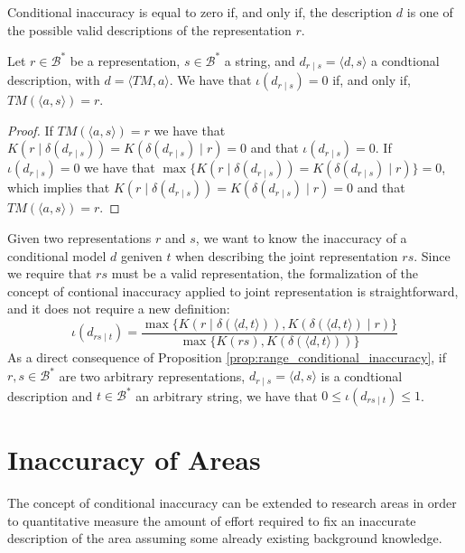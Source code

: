 Conditional inaccuracy is equal to zero if, and only if, the description $d$ is one of the possible valid descriptions of the representation $r$.

\begin{proposition}\label{prop:perfect_description}
Let $r \in \mathcal{B}^\ast$ be a representation, $s \in \mathcal{B}^\ast$ a string, and $d_{r \mid s} = \langle d, s \rangle$ a condtional description, with $ d = \langle TM, a \rangle$. We have that $\iota(d_{r \mid s}) = 0$ if, and only if, $TM \left(\langle a, s \rangle \right) = r$.
\end{proposition}
\begin{proof}
If $TM \left(\langle a, s \rangle \right) = r$ we have that $K \left( r \mid \delta(d_{r \mid s}) \right) = K \left( \delta(d_{r \mid s}) \mid r \right) = 0$ and that $\iota(d_{r \mid s}) = 0$. If $\iota(d_{r \mid s}) = 0$ we have that $\max\{ K \left( r \mid \delta(d_{r \mid s}) \right) = K \left( \delta(d_{r \mid s}) \mid r \right) \} = 0$, which implies that $K \left( r \mid \delta(d_{r \mid s}) \right) = K \left( \delta(d_{r \mid s}) \mid r \right) = 0$ and that $TM \left(\langle a, s \rangle \right) = r$.
\end{proof}

Given two representations $r$ and $s$, we want to know the inaccuracy of a conditional model $d$ geniven $t$ when describing the joint representation $rs$. Since we require that $rs$ must be a valid representation, the formalization of the concept of contional inaccuracy applied to joint representation is straightforward, and it does not require a new definition:
\[
\iota(d_{rs \mid t}) = \frac{ \max\{ K \left(r \mid \delta(\langle d, t \rangle) \right), K \left( \delta(\langle d, t \rangle) \mid r \right) \} } { \max\{ K(rs), K \left(\delta(\langle d, t \rangle) \right) \} }
\]
As a direct consequence of Proposition \ref{prop:range_conditional_inaccuracy}, if $r, s \in \mathcal{B}^\ast$ are two arbitrary representations, $d_{r \mid s} = \langle d, s \rangle$ is a condtional description and $t \in \mathcal{B}^\ast$ an arbitrary string, we have that $0 \leq \iota(d_{rs \mid t}) \leq 1$.

%
%

\section{Inaccuracy of Areas}

The concept of conditional inaccuracy can be extended to research areas in order to quantitative measure the amount of effort required to fix an inaccurate description of the area assuming some already existing background knowledge.

